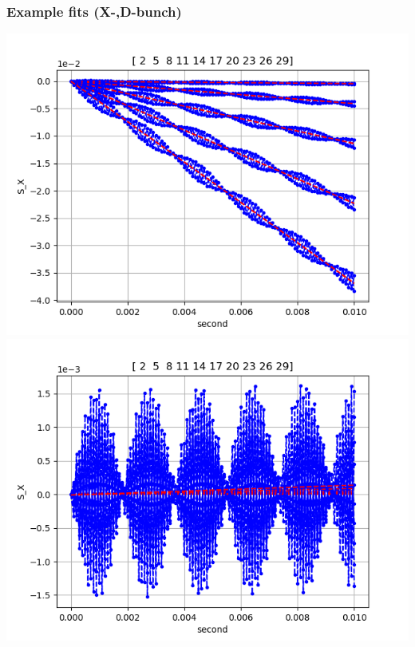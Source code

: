 \documentclass[pdf]{beamer}
\begin{document}
\begin{frame}
	\frametitle{Example fits (X-,D-bunch)}
	\centering
	\includegraphics[scale=.33]{decoh/Xbunch/Sx(unoptim)_for_X_bunch_decoh}
	\includegraphics[scale=.33]{decoh/Xbunch/Sx(optim)_for_X_bunch_decoh}
	

\end{frame}
\end{document}
